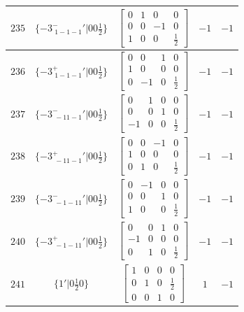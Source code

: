 \documentclass[fleqn,8pt]{jsarticle}
\begin{document}
\begin{longtable}{ccccc}
$ 235 $ & $ \{-3^{-}_{\,\,1-1-1}{}'|0 0 \frac{1}{2}\} $ & $ \begin{bmatrix} 0 & 1 & 0 & 0 \\ 0 & 0 & -1 & 0 \\ 1 & 0 & 0 & \frac{1}{2} \end{bmatrix} $ & $ -1 $ & $ -1 $ \\ \hline
$ 236 $ & $ \{-3^{+}_{\,\,1-1-1}{}'|0 0 \frac{1}{2}\} $ & $ \begin{bmatrix} 0 & 0 & 1 & 0 \\ 1 & 0 & 0 & 0 \\ 0 & -1 & 0 & \frac{1}{2} \end{bmatrix} $ & $ -1 $ & $ -1 $ \\ \hline
$ 237 $ & $ \{-3^{-}_{\,\,-11-1}{}'|0 0 \frac{1}{2}\} $ & $ \begin{bmatrix} 0 & 1 & 0 & 0 \\ 0 & 0 & 1 & 0 \\ -1 & 0 & 0 & \frac{1}{2} \end{bmatrix} $ & $ -1 $ & $ -1 $ \\ \hline
$ 238 $ & $ \{-3^{+}_{\,\,-11-1}{}'|0 0 \frac{1}{2}\} $ & $ \begin{bmatrix} 0 & 0 & -1 & 0 \\ 1 & 0 & 0 & 0 \\ 0 & 1 & 0 & \frac{1}{2} \end{bmatrix} $ & $ -1 $ & $ -1 $ \\ \hline
$ 239 $ & $ \{-3^{-}_{\,\,-1-11}{}'|0 0 \frac{1}{2}\} $ & $ \begin{bmatrix} 0 & -1 & 0 & 0 \\ 0 & 0 & 1 & 0 \\ 1 & 0 & 0 & \frac{1}{2} \end{bmatrix} $ & $ -1 $ & $ -1 $ \\ \hline
$ 240 $ & $ \{-3^{+}_{\,\,-1-11}{}'|0 0 \frac{1}{2}\} $ & $ \begin{bmatrix} 0 & 0 & 1 & 0 \\ -1 & 0 & 0 & 0 \\ 0 & 1 & 0 & \frac{1}{2} \end{bmatrix} $ & $ -1 $ & $ -1 $ \\ \hline
$ 241 $ & $ \{1{}'|0 \frac{1}{2} 0\} $ & $ \begin{bmatrix} 1 & 0 & 0 & 0 \\ 0 & 1 & 0 & \frac{1}{2} \\ 0 & 0 & 1 & 0 \end{bmatrix} $ & $ 1 $ & $ -1 $ \\ \hline

\end{longtable}
\end{document}
